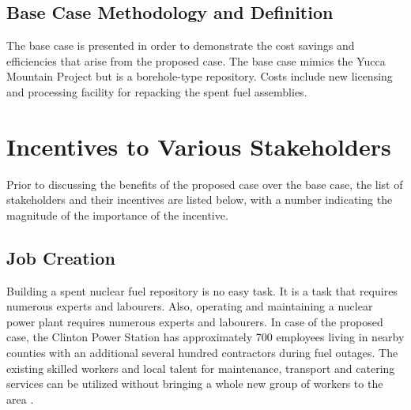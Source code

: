 \subsection{Base Case Methodology and Definition}
The base case is presented in order to demonstrate the cost savings and efficiencies 
that arise from the proposed case. The base case mimics the Yucca Mountain Project
but is a borehole-type repository. Costs include new licensing and processing facility
 for repacking the spent fuel assemblies.


\section {Incentives to Various Stakeholders}

Prior to discussing the benefits of the proposed case over the base case, the list of
 stakeholders and their incentives are listed below, with a number indicating the 
 magnitude of the importance of the incentive.
 
 
\begin{table}[h]

\centering
\caption {Incentive Criterion and Weight for Each Stakeholder}
\end{table}

\subsection{Job Creation}

Building a spent nuclear fuel repository is no easy task. It is a task that requires
numerous experts and labourers. Also, operating and maintaining a nuclear power plant
requires numerous experts and labourers. In case of the proposed case, the Clinton
 Power Station has approximately 700 employees living in nearby counties with an
additional several hundred contractors during fuel outages\cite{Exelon}.
The existing skilled workers and local talent for maintenance, transport and catering
services can be utilized without bringing a whole new group of workers to the area \cite{IAEA_2008}. 

